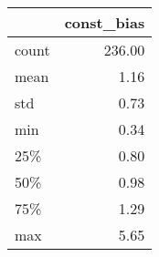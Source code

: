 \begin{tabular}{lr}
\toprule
{} &  const\_bias \\
\midrule
count &      236.00 \\
mean  &        1.16 \\
std   &        0.73 \\
min   &        0.34 \\
25\%   &        0.80 \\
50\%   &        0.98 \\
75\%   &        1.29 \\
max   &        5.65 \\
\bottomrule
\end{tabular}
